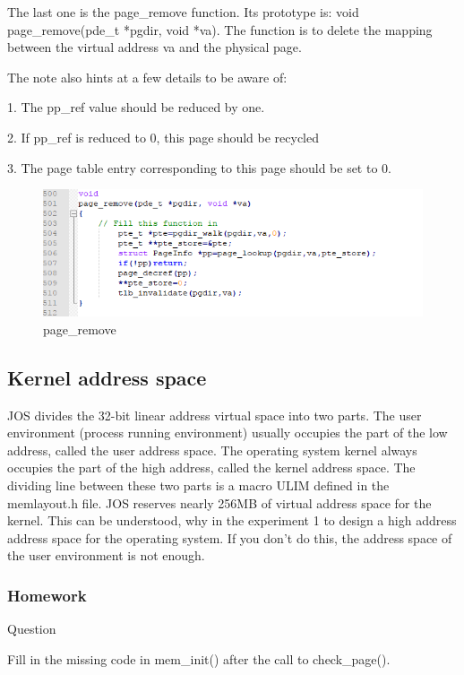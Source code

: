The last one is the page\_remove function. Its prototype is: void page\_remove(pde\_t *pgdir, void *va). The function is to delete the mapping between the virtual address va and the physical page.

The note also hints at a few details to be aware of:

1. The pp\_ref value should be reduced by one.

2. If pp\_ref is reduced to 0, this page should be recycled

3. The page table entry corresponding to this page should be set to 0.

\begin{figure}[H]
\centering
\includegraphics[width=0.8\linewidth]{figure/page_remove_changed}
\caption{page\_remove}
\end{figure}

\subsection{Kernel address space}

JOS divides the 32-bit linear address virtual space into two parts. The user environment (process running environment) usually occupies the part of the low address, called the user address space. The operating system kernel always occupies the part of the high address, called the kernel address space. The dividing line between these two parts is a macro ULIM defined in the memlayout.h file. JOS reserves nearly 256MB of virtual address space for the kernel. This can be understood, why in the experiment 1 to design a high address address space for the operating system. If you don't do this, the address space of the user environment is not enough.

\subsubsection{Homework }
\begin{flushleft}
{\Large Question}
\end{flushleft}
Fill in the missing code in mem\_init() after the call to check\_page().

